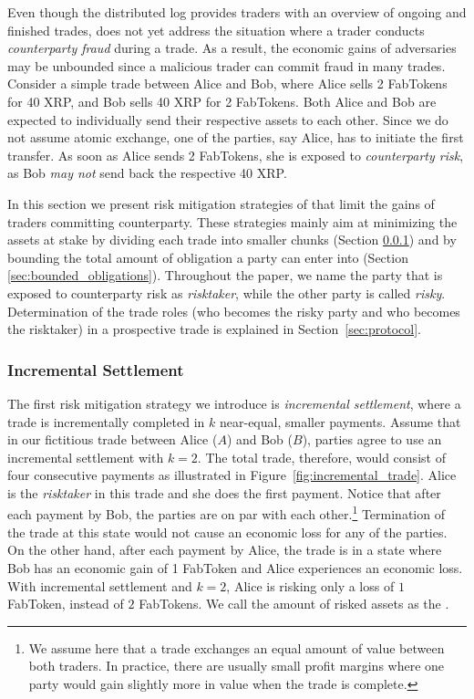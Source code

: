 Even though the distributed log provides traders with an overview of ongoing and finished trades, \ModelName{} does not yet address the situation where a trader conducts \emph{counterparty fraud} during a trade.
As a result, the economic gains of adversaries may be unbounded since a malicious trader can commit fraud in many trades.
Consider a simple trade between Alice and Bob, where Alice sells 2 FabTokens for 40 XRP, and Bob sells 40 XRP for 2 FabTokens.
Both Alice and Bob are expected to individually send their respective assets to each other. 
Since we do not assume atomic exchange, one of the parties, say Alice, has to initiate the first transfer.
As soon as Alice sends 2 FabTokens, she is exposed to \emph{counterparty risk}, as Bob \emph{may not} send back the respective 40 XRP.

In this section we present risk mitigation strategies of \ModelName{} that limit the gains of traders committing counterparty.
These strategies mainly aim at minimizing the assets at stake by dividing each trade into smaller chunks (Section \ref{sec:incremental_settlement}) and by bounding the total amount of obligation a party can enter into (Section \ref{sec:bounded_obligations}).
Throughout the paper, we name the party that is exposed to counterparty risk as \emph{risktaker}, while the other party is called \emph{risky}. 
Determination of the trade roles (who becomes the risky party and who becomes the risktaker) in a prospective trade is explained in Section~\ref{sec:protocol}.


\subsubsection{Incremental Settlement}
\label{sec:incremental_settlement}
The first risk mitigation strategy we introduce is \emph{incremental settlement}, where a trade is incrementally completed in $ k $ near-equal, smaller payments.
Assume that in our fictitious trade between Alice ($ A $) and Bob ($ B $), parties agree to use an incremental settlement with $ k = 2$.
The total trade, therefore, would consist of four consecutive payments as illustrated in Figure~\ref{fig:incremental_trade}. 
Alice is the \emph{risktaker} in this trade and she does the first payment.
Notice that after each payment by Bob, the parties are on par with each other.\footnote{We assume here that a trade exchanges an equal amount of value between both traders. In practice, there are usually small profit margins where one party would gain slightly more in value when the trade is complete.} 
Termination of the trade at this state would not cause an economic loss for any of the parties.
On the other hand, after each payment by Alice, the trade is in a state where Bob has an economic gain of 1 FabToken and Alice experiences an economic loss.
With incremental settlement and $ k = 2 $, Alice is risking only a loss of $ 1 $ FabToken, instead of $ 2 $ FabTokens.
We call the amount of risked assets as the \MarginalStake{}.

